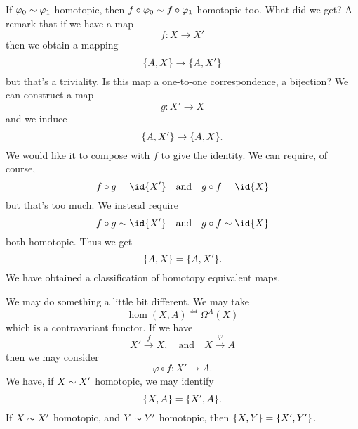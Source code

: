 If $\varphi_{0}\sim\varphi_{1}$ homotopic, then
$f\circ\varphi_{0}\sim f\circ\varphi_{1}$ homotopic
too. What did we get? A remark that if we have a map
\begin{equation}
f\colon X\to X'
\end{equation}
then we obtain a mapping
\begin{equation}
\homotopyClass(A,X)\to\homotopyClass(A,X')
\end{equation}
but that's a triviality. Is this map a one-to-one correspondence,
a bijection? We can construct a map
\begin{equation}
g\colon X'\to X
\end{equation}
and we induce
\begin{equation}
\homotopyClass(A,X')\to\homotopyClass(A,X).
\end{equation}
We would like it to compose with $f$ to give the identity. We can
require, of course, 
\begin{equation}
f\circ g=\id{X'}\quad\mbox{and}\quad
g\circ f=\id{X}
\end{equation}
but that's too much. We instead require
\begin{equation}
f\circ g\homotopic\id{X'}\quad\mbox{and}\quad
g\circ f\homotopic\id{X}
\end{equation}
both homotopic. Thus we get
\begin{equation}
\homotopyClass(A,X)=\homotopyClass(A,X').
\end{equation}
We have obtained a classification of homotopy equivalent maps.

We may do something a little bit different. We may take
\begin{equation}
\hom(X,A)\eqdef\Omega^{A}(X)
\end{equation}
which is a contravariant functor. If we have
\begin{equation}
X'\xrightarrow{f}X,\quad\mbox{and}\quad X\xrightarrow{\varphi}A
\end{equation}
then we may consider
\begin{equation}
\varphi\circ f\colon X'\to A.
\end{equation}
We have, if $X\sim X'$ homotopic, we may identify
\begin{equation}
\homotopyClass(X,A)=\homotopyClass(X',A).
\end{equation}
If $X\sim X'$ homotopic, and $Y\sim Y'$ homotopic,
then $\homotopyClass(X,Y)=\homotopyClass(X',Y')$.

